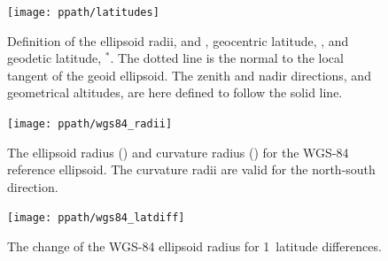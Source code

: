 \begin{figure}[!p]
 \begin{center}
  \begin{minipage}[c]{0.65\textwidth}
   \begin{center}
    \texttt{[image: ppath/latitudes]}
   \end{center}
  \end{minipage}%
  \begin{minipage}[c]{0.35\textwidth}
   \caption{Definition of the ellipsoid radii,  and , 
     geocentric latitude, \Lat, and geodetic latitude, \Lat$^*$. The
     dotted line is the normal to the local tangent of the geoid
     ellipsoid. The zenith and nadir directions, and geometrical
     altitudes, are here defined to follow the solid line.}
   \label{fig:ppath:lats}
  \end{minipage}
 \end{center}
\end{figure}   

\begin{figure}[!p]
 \begin{minipage}[c]{0.65\textwidth}
 \texttt{[image: ppath/wgs84\_radii]}
 \end{minipage}%
 \begin{minipage}[c]{0.35\textwidth}
  \caption{The ellipsoid radius (\aRds{\odot}) and curvature radius ()
    for the
    WGS-84 reference ellipsoid. The curvature radii are valid for the
    north-south direction.}
  \label{fig:ppath:wgs84radii}
 \end{minipage}%
\end{figure}   
        
\begin{figure}[!p]
 \begin{minipage}[c]{0.65\textwidth}
 \texttt{[image: ppath/wgs84\_latdiff]}
 \end{minipage}%
 \begin{minipage}[c]{0.35\textwidth}
  \caption{The change of the WGS-84 ellipsoid radius for  1\degree\ 
            latitude differences.}
  \label{fig:ppath:latdiff}
 \end{minipage}%
\end{figure}   


